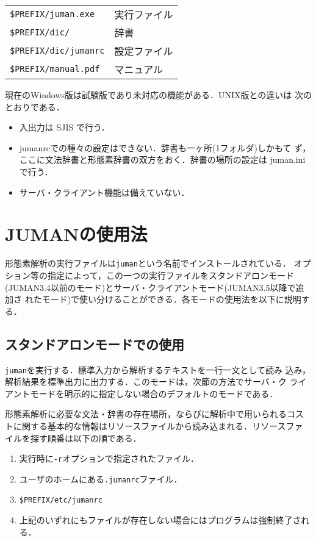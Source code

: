 \documentclass[a4j,titlepage]{jarticle}
\begin{document}
\begin{tabular}{ll}
 \texttt{\$PREFIX/juman.exe} & 実行ファイル \\
 \texttt{\$PREFIX/dic/} & 辞書 \\
 \texttt{\$PREFIX/dic/jumanrc} & 設定ファイル \\
 \texttt{\$PREFIX/manual.pdf} & マニュアル \\
\end{tabular}

\vspace*{3ex}

現在のWindows版は試験版であり未対応の機能がある．UNIX版との違いは
次のとおりである．
\begin{itemize}
 \item 入出力は SJIS で行う．
 \item jumanrcでの種々の設定はできない．辞書も一ヶ所(1フォルダ)しかもて
       ず，ここに文法辞書と形態素辞書の双方をおく．辞書の場所の設定は
       juman.iniで行う．
 \item サーバ・クライアント機能は備えていない．
\end{itemize}


\section{JUMANの使用法}\label{use}

形態素解析の実行ファイルは{\tt juman}という名前でインストールされている．
オプション等の指定によって，この一つの実行ファイルをスタンドアロンモード
(JUMAN3.4以前のモード)とサーバ・クライアントモード(JUMAN3.5以降で追加さ
れたモード)で使い分けることができる．各モードの使用法を以下に説明する．

\subsection{スタンドアロンモードでの使用}
\label{use-standalone}

{\tt juman}を実行する．標準入力から解析するテキストを一行一文として読み
込み，解析結果を標準出力に出力する．このモードは，次節の方法でサーバ・ク
ライアントモードを明示的に指定しない場合のデフォルトのモードである．

形態素解析に必要な文法・辞書の存在場所，ならびに解析中で用いられるコス
トに関する基本的な情報はリソースファイルから読み込まれる．リソースファ
イルを探す順番は以下の順である．
\begin{enumerate}
\item 実行時に{\tt -r}オプションで指定されたファイル．
\item ユーザのホームにある{\tt .jumanrc}ファイル．
\item \texttt{\$PREFIX/etc/jumanrc}
\item 上記のいずれにもファイルが存在しない場合にはプログラムは強制終了される．
\end{enumerate}
\end{document}

